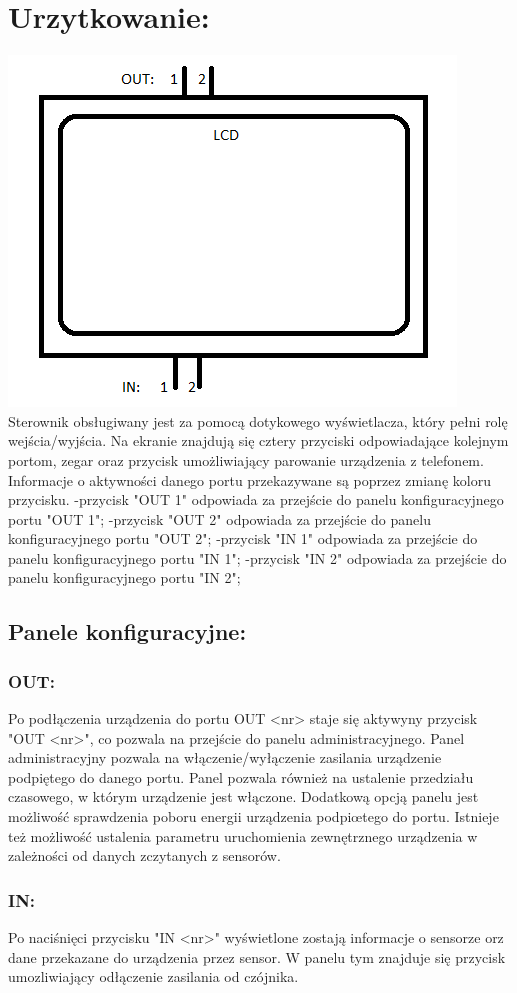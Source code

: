 \documentclass[11pt,a4paper]{article}
\begin{document}
	\section{Urzytkowanie:}
	\includegraphics[]{sterownikdomowy}\newline
	\pagebreak
	Sterownik obsługiwany jest za pomocą dotykowego wyświetlacza, który pełni rolę wejścia/wyjścia. 
	Na ekranie znajdują się cztery przyciski odpowiadające kolejnym portom, zegar oraz przycisk umożliwiający parowanie urządzenia z telefonem.
	Informacje o aktywności danego portu przekazywane są poprzez zmianę koloru przycisku. \newline 
	-przycisk "OUT 1" odpowiada za przejście do panelu konfiguracyjnego portu "OUT 1";\newline
	-przycisk "OUT 2" odpowiada za przejście do panelu konfiguracyjnego portu "OUT 2";\newline
	-przycisk "IN 1" odpowiada za przejście do panelu konfiguracyjnego portu "IN 1";\newline
	-przycisk "IN 2" odpowiada za przejście do panelu konfiguracyjnego portu "IN 2";\newline
	\subsection{Panele konfiguracyjne:}
	\subsubsection{OUT:}
	Po podłączenia urządzenia do portu OUT <nr> staje się aktywyny przycisk "OUT <nr>", co pozwala na przejście do panelu administracyjnego.
	Panel administracyjny pozwala na włączenie/wyłączenie zasilania urządzenie podpiętego do danego portu.
	Panel pozwala również na ustalenie przedziału czasowego, w którym urządzenie jest włączone. 
	Dodatkową opcją panelu jest możliwość sprawdzenia poboru energii urządzenia podpiœtego do portu.
	Istnieje też możliwość ustalenia parametru uruchomienia zewnętrznego urządzenia w zależności od danych zczytanych z sensorów. 
	\subsubsection{IN:}
	Po naciśnięci przycisku "IN <nr>" wyświetlone zostają informacje o sensorze orz dane przekazane do urządzenia przez sensor.
	W panelu tym znajduje się przycisk umozliwiający odłączenie zasilania od czójnika. 
	
\end{document}
